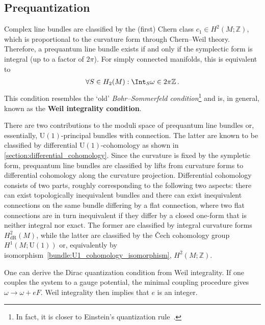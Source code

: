 \subsection{Prequantization}

    \begin{property}
        Complex line bundles are classified by the (first) Chern class $c_1\in H^2(M;\mathbb{Z})$, which is proportional to the curvature form through Chern--Weil theory. Therefore, a prequantum line bundle exists if and only if the symplectic form is integral (up to a factor of $2\pi$). For simply connected manifolds, this is equivalent to
        \begin{gather}
            \forall S\in H_2(M):\Int_S\omega\in 2\pi\mathbb{Z}\,.
        \end{gather}
        This condition resembles the `old' \textit{Bohr--Sommerfeld condition}\footnote{In fact, it is closer to Einstein's quantization rule~\citep{stone_einsteins_2005}.} and is, in general, known as the \textbf{Weil integrality condition}.

        There are two contributions to the moduli space of prequantum line bundles or, essentially, $\mathrm{U}(1)$-principal bundles with connection. The latter are known to be classified by differential $\mathrm{U}(1)$-cohomology as shown in \cref{section:differential_cohomology}. Since the curvature is fixed by the sympletic form, prequantum line bundles are classified by lifts from curvature forms to differential cohomology along the curvature projection. Differential cohomology consists of two parts, roughly corresponding to the following two aspects: there can exist topologically inequivalent bundles and there can exist inequivalent connections on the same bundle differing by a flat connection, where two flat connections are in turn inequivalent if they differ by a closed one-form that is neither integral nor exact. The former are classified by integral curvature forms $H^2_{\text{dR}}(M)$, while the latter are classified by the \v{C}ech cohomology group $H^1(M;\mathrm{U}(1))$ or, equivalently by isomorphism~\eqref{bundle:U1_cohomology_isomorphism}, $H^2(M;\mathbb{Z})$.
    \end{property}
    \begin{result}
        One can derive the Dirac quantization condition from Weil integrality. If one couples the system to a gauge potential, the minimal coupling procedure gives $\omega\longrightarrow\omega+eF$. Weil integrality then implies that $e$ is an integer.
    \end{result}

